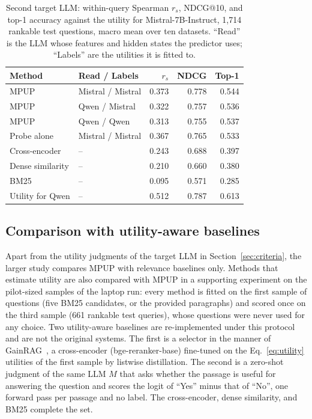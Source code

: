 \documentclass[conference]{IEEEtran}
\begin{document}
\begin{table}[htbp]
    \centering
    \caption{Second target LLM: within-query Spearman $r_s$, NDCG@10, and top-1 accuracy against the utility for Mistral-7B-Instruct, 1,714 rankable test questions, macro mean over ten datasets. ``Read'' is the LLM whose features and hidden states the predictor uses; ``Labels'' are the utilities it is fitted to.}
    \label{tab:crossllm}
    \footnotesize
    \begin{tabular}{llrrr}
        \toprule
        \textbf{Method} & \textbf{Read / Labels} & \textbf{$r_s$} & \textbf{NDCG} & \textbf{Top-1} \\
        \midrule
        MPUP & Mistral / Mistral & 0.373 & 0.778 & 0.544 \\
        MPUP & Qwen / Mistral & 0.322 & 0.757 & 0.536 \\
        MPUP & Qwen / Qwen & 0.313 & 0.755 & 0.537 \\
        Probe alone & Mistral / Mistral & 0.367 & 0.765 & 0.533 \\
        \midrule
        Cross-encoder & -- & 0.243 & 0.688 & 0.397 \\
        Dense similarity & -- & 0.210 & 0.660 & 0.380 \\
        BM25 & -- & 0.095 & 0.571 & 0.285 \\
        \midrule
        Utility for Qwen & -- & 0.512 & 0.787 & 0.613 \\
        \bottomrule
    \end{tabular}
\end{table}

\subsection{Comparison with utility-aware baselines}\label{sec:sota}
Apart from the utility judgments of the target LLM in Section~\ref{sec:criteria}, the larger study compares MPUP with relevance baselines only. Methods that estimate utility are also compared with MPUP in a supporting experiment on the pilot-sized samples of the laptop run: every method is fitted on the first sample of questions (five BM25 candidates, or the provided paragraphs) and scored once on the third sample (661 rankable test queries), whose questions were never used for any choice. Two utility-aware baselines are re-implemented under this protocol and are not the original systems. The first is a selector in the manner of GainRAG~\cite{jiang2025}, a cross-encoder (bge-reranker-base) fine-tuned on the Eq.~\eqref{eq:utility} utilities of the first sample by listwise distillation. The second is a zero-shot judgment of the same LLM $M$ that asks whether the passage is useful for answering the question and scores the logit of ``Yes'' minus that of ``No'', one forward pass per passage and no label. The cross-encoder, dense similarity, and BM25 complete the set.
\end{document}
